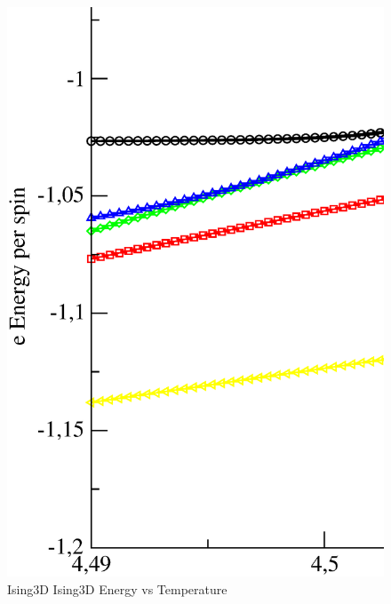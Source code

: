 \begin{figure}[!htpb]
  \centering
  \includegraphics[width=\textwidth]{./plots/Ising3D/Ising3D_Energy_vs_Temperature.eps}
  \caption{Ising3D Ising3D Energy vs Temperature}
\end{figure}

